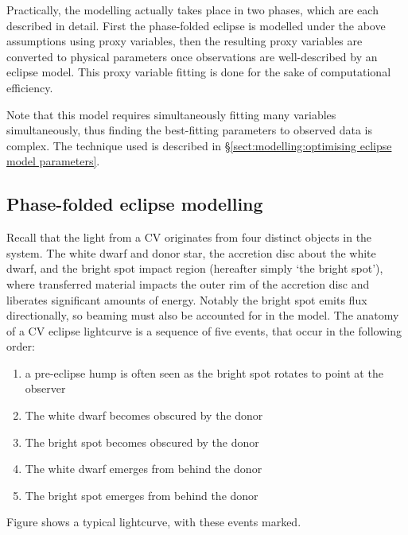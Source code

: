 Practically, the modelling actually takes place in two phases, which are each described in detail. First the phase-folded eclipse is modelled under the above assumptions using proxy variables, then the resulting proxy variables are converted to physical parameters once observations are well-described by an eclipse model. This proxy variable fitting is done for the sake of computational efficiency.

Note that this model requires simultaneously fitting many variables simultaneously, thus finding the best-fitting parameters to observed data is complex. The technique used is described in \S\ref{sect:modelling:optimising eclipse model parameters}.

\subsection{Phase-folded eclipse modelling}
\label{sect:modelling:eclipse modelling}

Recall that the light from a CV originates from four distinct objects in the system. The white dwarf and donor star, the accretion disc about the white dwarf, and the bright spot impact region (hereafter simply `the bright spot'), where transferred material impacts the outer rim of the accretion disc and liberates significant amounts of energy. Notably the bright spot emits flux directionally, so beaming must also be accounted for in the model.
The anatomy of a CV eclipse lightcurve is a sequence of five events, that occur in the following order:
\begin{enumerate}
    \setlength\itemsep{0em}
    \item a pre-eclipse hump is often seen as the bright spot rotates to point at the observer
    \item The white dwarf becomes obscured by the donor
    \item The bright spot becomes obscured by the donor
    \item The white dwarf emerges from behind the donor
    \item The bright spot emerges from behind the donor
\end{enumerate}
Figure shows a typical lightcurve, with these events marked.

